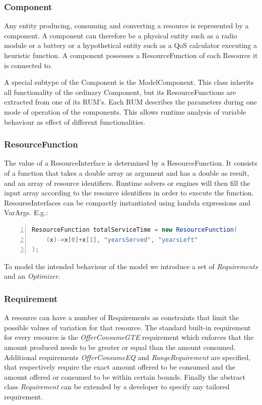 \subsubsection{Component}
Any entity producing, consuming and converting a resource is represented by a component. A component can therefore be a physical entity such as a radio module or a battery or a hypothetical entity such as a QoS calculator executing a heuristic function. A component possesses a ResourceFunction of each Resource it is connected to.

A special subtype of the Component is the ModelComponent. This class inherits all functionality of the ordinary Component, but its ResourceFunctions are extracted from one of its RUM's. Each RUM describes the parameters during one mode of operation of the components. This allows runtime analysis of variable behaviour as effect of different functionalities.

\subsubsection{ResourceFunction}
The value of a ResourceInterface is determined by a ResourceFunction. It consists of a function that takes a double array as argument and has a double as result, and an array of resource identifiers. Runtime solvers or engines will then fill the input array according to the resource identifiers in order to execute the function. ResourseInterfaces can be compactly instantiated using lambda expressions and VarArgs. E.g.:
\begin{lstlisting}[language=java, frame=single, numbers=left, tabsize=4, basicstyle=\small]
ResourceFunction totalServiceTime = new ResourceFunction(
	(x)->x[0]+x[1], "yearsServed", "yearsLeft"
);
\end{lstlisting}

To model the intended behaviour of the model we introduce a set of \emph{Requirements} and an \emph{Optimizer}.
\subsubsection{Requirement}
A resource can have a number of Requirements as constraints that limit the possible values of variation for that resource. The standard built-in requirement for every resource is the \emph{OfferConsumeGTE} requirement which enforces that the amount produced needs to be greater or equal than the amount consumed. Additional requirements \emph{OfferConsumeEQ} and \emph{RangeRequirement} are specified, that respectively require the exact amount offered to be consumed and the amount offered or consumed to be within certain bounds. Finally the abstract class \emph{Requirement} can be extended by a developer to specify any tailored requirement.
